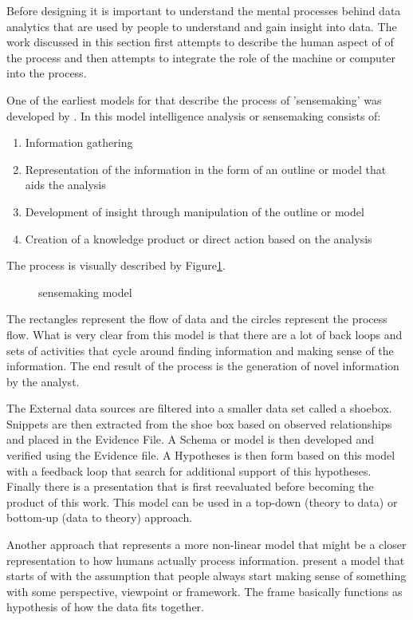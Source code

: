 Before designing it is important to understand the mental processes behind data analytics that are used by people to understand and gain insight into data. The work discussed in this section first attempts to describe the human aspect of of the process and then attempts to integrate the role of the machine or computer into the process.

One of the earliest  models for that describe the process of 'sensemaking' was developed by \cite{pirolli2005sensemaking}. In this model intelligence analysis or sensemaking  consists of:
\begin{enumerate}
	\item Information gathering
	\item Representation of the information in the form of an outline or model that aids the analysis
	\item Development of insight through manipulation of the outline or model
	\item Creation of a knowledge product or direct action based on the analysis
\end{enumerate}
The process is visually described by Figure\ref{fig:3}.
\begin{figure}[!ht]
	\centering{}
	\caption{\cite{pirolli2005sensemaking} sensemaking model}\label{fig:3}
\end{figure}

The rectangles represent the flow of data and the circles represent the process flow. What is very clear from this model is that there are a lot of back loops and sets of activities that cycle around finding information and making sense of the information. The end result of the process is the generation of novel information by the analyst.

The External data sources are filtered into a smaller data set called a shoebox. Snippets are then extracted from the shoe box based on observed relationships and placed in the Evidence File. A Schema or model is then developed and verified using the Evidence file. A Hypotheses is then form based on this model with a feedback loop that search for additional support of this hypotheses. Finally there is a presentation that is first reevaluated before becoming the product of this work. This model can be used in a top-down (theory to data)  or bottom-up (data to theory) approach.

Another approach that represents a more non-linear model that might be a closer representation to how humans actually process information. \cite{klein2006making} present a model that starts of with the assumption that people always start making sense of something with some perspective, viewpoint or framework. The frame basically functions as hypothesis of how the data fits together.

